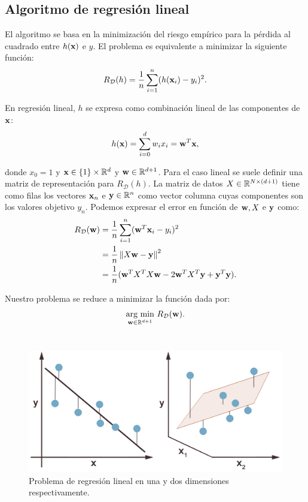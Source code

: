\documentclass[oneside,openright,titlepage,numbers=noenddot,openany,headinclude,footinclude=true,
cleardoublepage=empty,abstractoff,BCOR=5mm,paper=a4,fontsize=12pt,main=spanish]{scrreprt}
\begin{document}
\subsection*{Algoritmo de regresión lineal}

El algoritmo se basa en la minimización del riesgo empírico para la pérdida al cuadrado entre $h(\textbf{x})$ e $y$. El problema es equivalente a minimizar la siguiente función:
\begin{equation*}
    R_{\mathcal{D}}(h) = \frac{1}{n} \sum_{i=1}^n (h(\textbf{x}_i)-y_i)^2.
\end{equation*}

En regresión lineal, $h$ se expresa como combinación lineal de las componentes de $\textbf{x}$: 
\begin{equation*}
    h(\textbf{x})=\sum_{i=0}^d w_i x_i = \textbf{w}^T \textbf{x},
\end{equation*}

donde $x_0=1$ y $\textbf{x} \in \{1\} \times \mathbb{R}^d$ y $\textbf{w} \in \mathbb{R}^{d+1}$. Para el caso lineal se suele definir una matriz de representación para $R_{\mathcal{D}}(h)$. La matriz de datos $X\in \mathbb{R}^{N \times (d+1)}$ tiene como filas los vectores $\textbf{x}_n$ e $\textbf{y}\in \mathbb{R}^n$ como vector columna cuyas componentes son los valores objetivo $y_n$. Podemos expresar el error en función de $\textbf{w}, X$ e $\textbf{y}$ como:
\begin{equation}
\begin{split}
    R_{\mathcal{D}}(\textbf{w})&=\frac{1}{n}\sum_{i=1}^n (\textbf{w}^T\textbf{x}_i-y_i)^2\\
    &=\frac{1}{n} \left\lVert X\textbf{w}-\textbf{y}\right\rVert^2\\
    &=\frac{1}{n} (\textbf{w}^TX^TX\textbf{w} -2\textbf{w}^TX^T\textbf{y}+\textbf{y}^T\textbf{y}).
\end{split}
\label{eq:derivable}
\end{equation}

Nuestro problema se reduce a minimizar la función dada por: 
\begin{equation}
    \underset{\nm{w}\in \R^{d+1}}{\text{arg min}} \ R_{\mathcal{D}}(\nm{w}).
    \label{eq:soloptima}
\end{equation}\

\begin{figure}[h]
	\centering
	\includegraphics[width=13.3cm]{linear_regresion.png}
	\caption{Problema de regresión lineal en una y dos dimensiones respectivamente.}
    \label{fig:reglin}
\end{figure}
\end{document}
